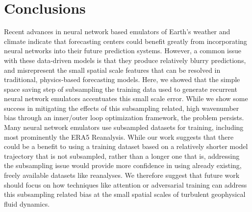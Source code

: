 \section{Conclusions}
\label{sec:conclusions}

Recent advances in neural network based emulators of Earth's weather and climate
indicate that forecasting centers could benefit greatly from incorporating
neural networks into their future prediction systems.
However, a common issue with these data-driven models is that they produce
relatively blurry predictions, and misrepresent the small spatial scale features
that can be resolved in traditional, physics-based forecasting models.
Here, we showed that the simple space saving step of subsampling the training
data used to generate recurrent neural network emulators accentuates this
small scale error.
While we show some success in mitigating the effects of this subsampling
related, high wavenumber bias through an inner/outer loop optimization
framework, the problem persists.
Many neural network emulators use subsampled datasets for training, including
most prominently the ERA5 Reanalysis.
While our work suggests that there could be a benefit to using a training
dataset based on a relatively
shorter model trajectory that is not subsampled, rather than a longer one that
is, addressing the subsampling issue would provide more confidence in using
already existing, freely available datasets like reanalyses.
We therefore suggest that future work should focus on how techniques like
attention or adversarial training can address this subsampling related bias at
the small spatial scales of turbulent geophysical fluid dynamics.
